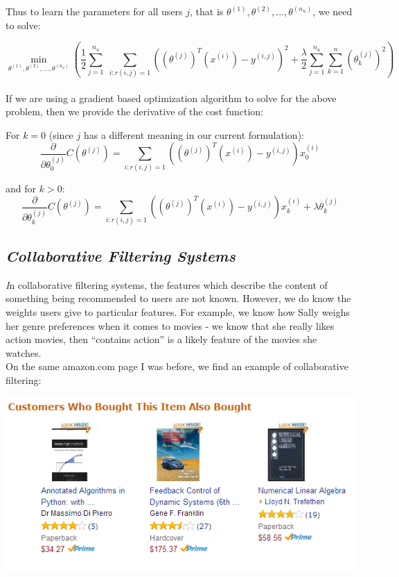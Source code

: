 \documentclass[11pt,a4paper,oneside]{report}
\begin{document}
Thus to learn the parameters for all users $j$, that is $\theta^{(1)}, \theta^{(2)}, ..., \theta^{(n_u)}$, we need to solve:

\[
\boxed{\min_{\theta^{(1)}, \theta^{(2)}, ..., \theta^{(n_u)}} \left(\frac{1}{2} \sum_{j=1}^{n_u}\;\sum_{i:r(i,j)=1}((\theta^{(j)})^T(x^{(i)}) - y^{(i,j)})^2 + \frac{\lambda}{2}\sum_{j=1}^{n_u}\sum_{k=1}^n(\theta^{(j)}_k)^2\right)}\]\\

If we are using a gradient based optimization algorithm to solve for the above problem, then we provide the derivative of the cost function:

\begin{framed}
\noindent
For $k=0$ (since $j$ has a different meaning in our current formulation):
\[
\frac{\partial}{\partial \theta^{(j)}_0}C(\theta^{(j)}) = \sum_{i:r(i,j)=1}((\theta^{(j)})^T(x^{(i)}) - y^{(i,j)})x^{(i)}_0
\]

\noindent
and for $k > 0$:
\[
\frac{\partial}{\partial \theta^{(j)}_k}C(\theta^{(j)}) = \sum_{i:r(i,j)=1}((\theta^{(j)})^T(x^{(i)}) - y^{(i,j)})x^{(i)}_k + \lambda\theta^{(j)}_k
\]
\end{framed}

{\center\color{magenta}
\subsection*{\it\huge Collaborative Filtering Systems}}

{\it\huge I}n collaborative filtering systems, the features which describe the content of something being recommended to users are not known. However, we do know the weights users give to particular features. For example, we know how Sally weighs her genre preferences when it comes to movies - we know that she really likes action movies, then ``contains action'' is a likely feature of the movies she watches.\\

On the same amazon.com page I was before, we find an example of collaborative filtering:\\

\begin{center}
\includegraphics[scale=1]{cf.png}
\end{center}
\end{document}
